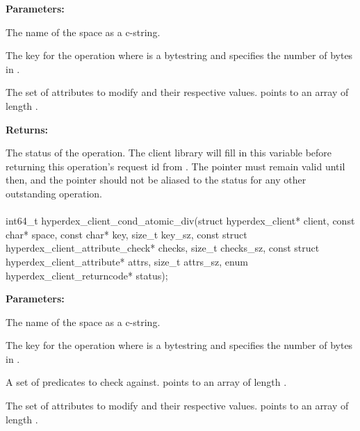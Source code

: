 \noindent\textbf{Parameters:}
\begin{description}[labelindent=\widthof{{\code{attrs}, \code{attrs\_sz}}},leftmargin=*,noitemsep,nolistsep,align=right]
\item[\code{space}] The name of the space as a c-string.
\item[\code{key}, \code{key\_sz}] The key for the operation where  is a bytestring and  specifies the number of bytes in .
\item[\code{attrs}, \code{attrs\_sz}] The set of attributes to modify and their respective values.   points to an array of length .
\end{description}

\noindent\textbf{Returns:}
\begin{description}[labelindent=\widthof{{\code{status}}},leftmargin=*,noitemsep,nolistsep,align=right]
\item[\code{status}] The status of the operation.  The client library will fill in this variable before returning this operation's request id from .  The pointer must remain valid until then, and the pointer should not be aliased to the status for any other outstanding operation.
\end{description}

\paragraph{}
\label{api:c:cond_atomic_div}
\begin{ccode}
int64_t hyperdex_client_cond_atomic_div(struct hyperdex_client* client,
                const char* space,
                const char* key, size_t key_sz,
                const struct hyperdex_client_attribute_check* checks, size_t checks_sz,
                const struct hyperdex_client_attribute* attrs, size_t attrs_sz,
                enum hyperdex_client_returncode* status);
\end{ccode}
\funcdesc 

\noindent\textbf{Parameters:}
\begin{description}[labelindent=\widthof{{\code{checks}, \code{checks\_sz}}},leftmargin=*,noitemsep,nolistsep,align=right]
\item[\code{space}] The name of the space as a c-string.
\item[\code{key}, \code{key\_sz}] The key for the operation where  is a bytestring and  specifies the number of bytes in .
\item[\code{checks}, \code{checks\_sz}] A set of predicates to check against.   points to an array of length .
\item[\code{attrs}, \code{attrs\_sz}] The set of attributes to modify and their respective values.   points to an array of length .
\end{description}

